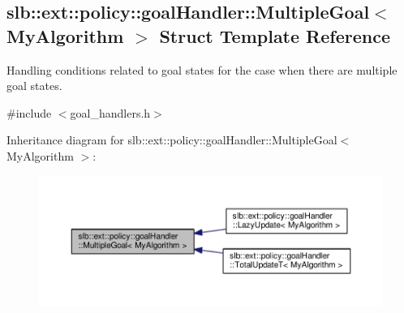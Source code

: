 \hypertarget{structslb_1_1ext_1_1policy_1_1goalHandler_1_1MultipleGoal}{}\subsection{slb\+:\+:ext\+:\+:policy\+:\+:goal\+Handler\+:\+:Multiple\+Goal$<$ My\+Algorithm $>$ Struct Template Reference}
\label{structslb_1_1ext_1_1policy_1_1goalHandler_1_1MultipleGoal}


Handling conditions related to goal states for the case when there are multiple goal states.  




{\ttfamily \#include $<$goal\+\_\+handlers.\+h$>$}



Inheritance diagram for slb\+:\+:ext\+:\+:policy\+:\+:goal\+Handler\+:\+:Multiple\+Goal$<$ My\+Algorithm $>$\+:\nopagebreak
\begin{figure}[H]
\begin{center}
\leavevmode
\includegraphics[width=350pt]{structslb_1_1ext_1_1policy_1_1goalHandler_1_1MultipleGoal__inherit__graph}
\end{center}
\end{figure}
